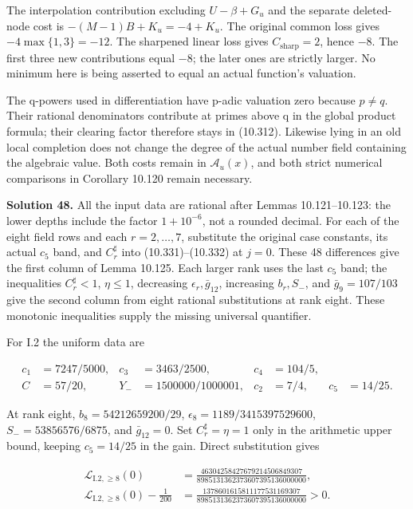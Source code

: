 \documentclass[
  11pt,
  a4paper,
]{article}
\begin{document}
The interpolation contribution excluding \(U-\beta+G_u\) and the
separate deleted-node cost is \(-(M-1)B+K_u=-4+K_u\). The original
common loss gives \(-4\max\{1,3\}=-12\). The sharpened linear loss gives
\(C_{\mathrm{sharp}}=2\), hence \(-8\). The first three new
contributions equal \(-8\); the later ones are strictly larger. No
minimum here is being asserted to equal an actual function's valuation.

The q-powers used in differentiation have p-adic valuation zero because
\(p\ne q\). Their rational denominators contribute at primes above q in
the global product formula; their clearing factor therefore stays in
(10.312). Likewise lying in an old local completion does not change the
degree of the actual number field containing the algebraic value. Both
costs remain in \(\mathcal A_u(x)\), and both strict numerical
comparisons in Corollary 10.120 remain necessary.

\textbf{Solution 48.} All the input data are rational after Lemmas
10.121--10.123: the lower depths include the factor \(1+10^{-6}\), not a
rounded decimal. For each of the eight field rows and each
\(r=2,\ldots,7\), substitute the original case constants, its actual
\(c_5\) band, and \(C_r^{\sharp}\) into (10.331)--(10.332) at \(j=0\).
These 48 differences give the first column of Lemma 10.125. Each larger
rank uses the last \(c_5\) band; the inequalities \(C_r^{\sharp}<1\),
\(\eta\le1\), decreasing \(\epsilon_r,\bar g_{12}\), increasing
\(b_r,S_-\), and \(\bar g_9=107/103\) give the second column from eight
rational substitutions at rank eight. These monotonic inequalities
supply the missing universal quantifier.

For I.2 the uniform data are

\[
\begin{aligned}
c_1&=7247/5000,&c_3&=3463/2500,&c_4&=104/5,\\
C&=57/20,&Y_-&=1500000/1000001,&c_2&=7/4,&c_5&=14/25.
\end{aligned}
\]

At rank eight, \(b_8=54212659200/29\),
\(\epsilon_8=1189/3415397529600\), \(S_-=53856576/6875\), and
\(\bar g_{12}=0\). Set \(C_r^{\sharp}=\eta=1\) only in the arithmetic
upper bound, keeping \(c_5=14/25\) in the gain. Direct substitution
gives

\[
\begin{aligned}
\mathcal L_{\mathrm{I.2},\ge8}(0)
&=\frac{46304258427679214506849307}
{8985131362373607395136000000},\\
\mathcal L_{\mathrm{I.2},\ge8}(0)-\frac1{200}
&=\frac{1378601615811177531169307}
{8985131362373607395136000000}>0.
\end{aligned}
\]
\end{document}
